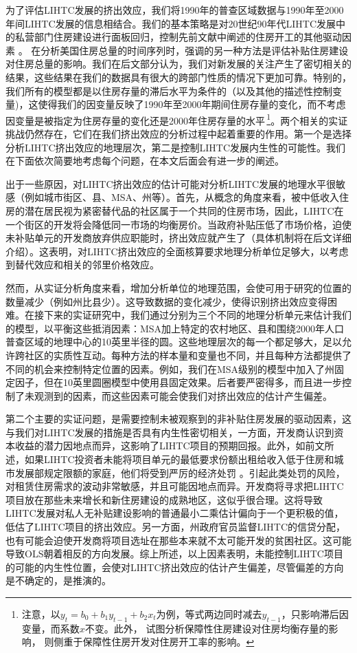 \documentclass[lang=cn,11pt,a4paper]{paper}
\begin{document}
为了评估LIHTC发展的挤出效应，我们将1990年的普查区域数据与1990年至2000年间LIHTC发展的信息相结合。我们的基本策略是对20世纪90年代LIHTC发展中的私营部门住房建设进行面板回归，控制先前文献中阐述的住房开工的其他驱动因素 \cite{Mayer200085}。\cite{Murray1999107} 在分析美国住房总量的时间序列时，强调的另一种方法是评估补贴住房建设对住房总量的影响。我们在后文部分认为，我们对新发展的关注产生了密切相关的结果，这些结果在我们的数据具有很大的跨部门性质的情况下更加可靠。特别的，我们所有的模型都是以住房存量的滞后水平为条件的（以及其他的描述性控制变量)，这使得我们的因变量反映了1990年至2000年期间住房存量的变化，而不考虑因变量是被指定为住房存量的变化还是2000年住房存量的水平\,\footnote{注意，以$y_t=b_0+b_1y_{t-1}+b_2x_t$为例，等式两边同时减去$y_{t-1}$，只影响滞后因变量，而系数$x$不变。此外，\cite{Murray1999107} 试图分析保障性住房建设对住房均衡存量的影响，\cite{Murray1983590} 则侧重于保障性住房开发对住房开工率的影响。}。两个相关的实证挑战仍然存在，它们在我们挤出效应的分析过程中起着重要的作用。第一个是选择分析LIHTC挤出效应的地理层次，第二是控制LIHTC发展内生性的可能性。我们在下面依次简要地考虑每个问题，在本文后面会有进一步的阐述。

出于一些原因，对LIHTC挤出效应的估计可能对分析LIHTC发展的地理水平很敏感（例如城市街区、县、MSA、州等）。首先，从概念的角度来看，被中低收入住房的潜在居民视为紧密替代品的社区属于一个共同的住房市场，因此，LIHTC在一个街区的开发将会降低同一市场的均衡房价。当政府补贴压低了市场价格，迫使未补贴单元的开发商放弃供应职能时，挤出效应就产生了（具体机制将在后文详细介绍）。这表明，对LIHTC挤出效应的全面核算要求地理分析单位足够大，以考虑到替代效应和相关的邻里价格效应。

然而，从实证分析角度来看，增加分析单位的地理范围，会使可用于研究的位置的数量减少（例如州比县少）。这导致数据的变化减少，使得识别挤出效应变得困难。在接下来的实证研究中，我们通过分别为三个不同的地理分析单元来估计我们的模型，以平衡这些抵消因素：MSA加上特定的农村地区、县和围绕2000年人口普查区域的地理中心的10英里半径的圆。这些地理层次的每一个都足够大，足以允许跨社区的实质性互动。每种方法的样本量和变量也不同，并且每种方法都提供了不同的机会来控制特定位置的因素。例如，我们在MSA级别的模型中加入了州固定因子，但在10英里圆圈模型中使用县固定效果。后者要严密得多，而且进一步控制了未观测到的因素，而这些因素可能会使我们对挤出效应的估计产生偏差。

第二个主要的实证问题，是需要控制未被观察到的非补贴住房发展的驱动因素，这与我们对LIHTC发展的措施是否具有内生性密切相关，一方面，开发商认识到资本收益的潜力因地点而异，这影响了LIHTC项目的预期回报。此外，如前文所述，如果LIHTC投资者未能将项目单元的最低要求份额出租给收入低于住房和城市发展部规定限额的家庭，他们将受到严厉的经济处罚 \citep{Eriksen2009141}。引起此类处罚的风险，对租赁住房需求的波动非常敏感，并且可能因地点而异。开发商将寻求把LIHTC项目放在那些未来增长和新住房建设的成熟地区，这似乎很合理。这将导致LIHTC发展对私人无补贴建设影响的普通最小二乘估计偏向于一个更积极的值，低估了LIHTC项目的挤出效应。另一方面，州政府官员监督LIHTC的信贷分配，也有可能会迫使开发商将项目选址在那些本来就不太可能开发的贫困社区。这可能导致OLS朝着相反的方向发展。综上所述，以上因素表明，未能控制LIHTC项目的可能的内生性位置，会使对LIHTC挤出效应的估计产生偏差，尽管偏差的方向是不确定的，是推演的。
\end{document}
